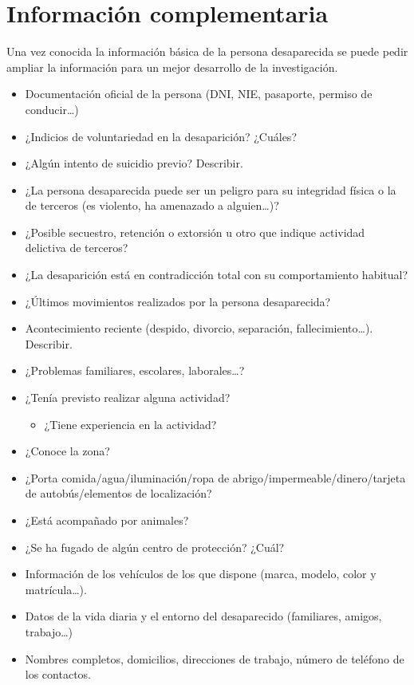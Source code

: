 \section{Información complementaria}
Una vez conocida la información básica de la persona desaparecida se puede pedir ampliar la información para un mejor desarrollo de la investigación. 
\begin{itemize}
    \item Documentación oficial de la persona (DNI, NIE, pasaporte, permiso de conducir…)
    \item ¿Indicios de voluntariedad en la desaparición? ¿Cuáles?
    \item ¿Algún intento de suicidio previo? Describir.
    \item ¿La persona desaparecida puede ser un peligro para su integridad física o la de terceros (es violento, ha amenazado a alguien…)?
    \item ¿Posible secuestro, retención o extorsión u otro que indique actividad delictiva de terceros?
    \item ¿La desaparición está en contradicción total con su comportamiento habitual?
    \item ¿Últimos movimientos realizados por la persona desaparecida?
    \item Acontecimiento reciente (despido, divorcio, separación, fallecimiento…). Describir.
    \item ¿Problemas familiares, escolares, laborales…?
    \item ¿Tenía previsto realizar alguna actividad?
    \begin{itemize}
        \item ¿Tiene experiencia en la actividad?
    \end{itemize}
    \item ¿Conoce la zona?
    \item ¿Porta comida/agua/iluminación/ropa de abrigo/impermeable/dinero/tarjeta de autobús/elementos de localización?
    \item ¿Está acompañado por animales?
    \item ¿Se ha fugado de algún centro de protección? ¿Cuál?
    \item Información de los vehículos de los que dispone (marca, modelo, color y matrícula…).
    \item Datos de la vida diaria y el entorno del desaparecido (familiares, amigos, trabajo…)
    \item Nombres completos, domicilios, direcciones de trabajo, número de teléfono de los contactos.

\end{itemize}
